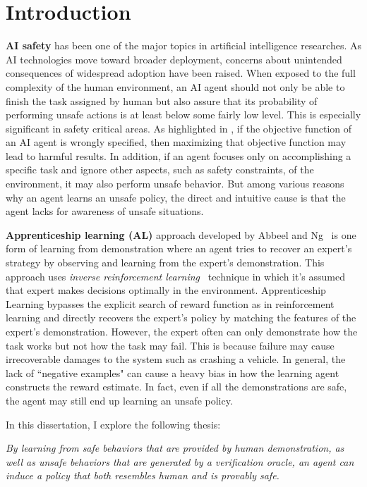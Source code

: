 \chapter{Introduction}
\label{chapter:Introduction}
\thispagestyle{myheadings}
{\bf AI safety} has been one of the major topics in artificial intelligence researches. As AI technologies move toward broader deployment, concerns about unintended consequences of widespread adoption have been raised. When exposed to the full complexity of the human environment, an AI agent should not only be able to finish the task assigned by human but also assure that its probability of performing unsafe actions is at least below some fairly low level. This is especially significant in safety critical areas. As highlighted in \cite{AmodeiOSCSM16}, if the objective function of an AI agent is wrongly specified, then maximizing that objective function may lead to harmful results. In addition, if an agent focuses only on accomplishing a specific task and ignore other aspects, such as safety constraints, of the environment, it may also perform unsafe behavior. But among various reasons why an agent learns an unsafe policy, the direct and intuitive cause is that the agent lacks for awareness of unsafe situations.  

{\bf Apprenticeship learning (AL)} approach developed by Abbeel and Ng~\cite{Abbeel:2004:ALV:1015330.1015430} is one form of learning from demonstration where an agent tries to recover an expert's strategy by observing and learning from the expert's demonstration. This approach uses {\it inverse reinforcement learning}~\cite{Ng:2000:AIR:645529.657801} technique in which it's assumed that expert makes decisions optimally in the environment. Apprenticeship Learning bypasses the explicit search of reward function as in reinforcement learning and directly recovers the expert's policy by matching the features of the expert's demonstration. However, the expert often can only demonstrate how the task works but not how the task may fail. This is because failure may cause irrecoverable damages to the system such as crashing a vehicle. In general, the lack of ``negative examples" can cause a heavy bias in how the learning agent constructs the reward estimate. In fact, even if all the demonstrations are safe, the agent may still end up learning an unsafe policy.

In this dissertation, I explore the following thesis:

\emph {
By learning from safe behaviors that are provided by human demonstration, as well as unsafe behaviors that are generated by a verification oracle, an agent can induce a policy that both resembles human and is provably safe. 
} 

